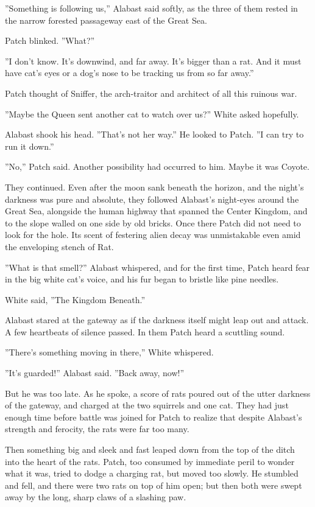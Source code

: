 \documentclass[12pt]{book}
\begin{document}
''Something is following us,'' Alabast said softly, as the three of them rested in the narrow forested passageway east of the Great Sea.

Patch blinked. ''What?''

''I don't know. It's downwind, and far away. It's bigger than a rat. And it must have cat's eyes or a dog's nose to be tracking us from so far away.''

Patch thought of Sniffer, the arch-traitor and architect of all this ruinous war.

''Maybe the Queen sent another cat to watch over us?'' White asked hopefully.

Alabast shook his head. ''That's not her way.'' He looked to Patch. ''I can try to run it down.''

''No,'' Patch said. Another possibility had occurred to him. Maybe it was Coyote.

They continued. Even after the moon sank beneath the horizon, and the night's darkness was pure and absolute, they followed Alabast's night-eyes around the Great Sea, alongside the human highway that spanned the Center Kingdom, and to the slope walled on one side by old bricks. Once there Patch did not need to look for the hole. Its scent of festering alien decay was unmistakable even amid the enveloping stench of Rat.

''What is that smell?'' Alabast whispered, and for the first time, Patch heard fear in the big white cat's voice, and his fur began to bristle like pine needles.

White said, ''The Kingdom Beneath.''

Alabast stared at the gateway as if the darkness itself might leap out and attack. A few heartbeats of silence passed. In them Patch heard a scuttling sound.

''There's something moving in there,'' White whispered.

''It's guarded!'' Alabast said. ''Back away, now!''

But he was too late. As he spoke, a score of rats poured out of the utter darkness of the gateway, and charged at the two squirrels and one cat. They had just enough time before battle was joined for Patch to realize that despite Alabast's strength and ferocity, the rats were far too many.

Then something big and sleek and fast leaped down from the top of the ditch into the heart of the rats. Patch, too consumed by immediate peril to wonder what it was, tried to dodge a charging rat, but moved too slowly. He stumbled and fell, and there were two rats on top of him open; but then both were swept away by the long, sharp claws of a slashing paw.
\end{document}
